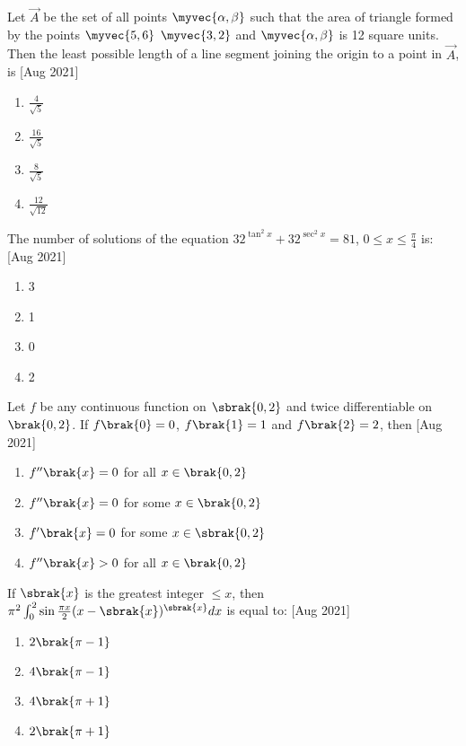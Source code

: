 
\iffalse
  \title{August:2021}
  \author{AI24BTECH11016}
  \section{mcq-single}
\fi
	\item
	Let $\vec{A}$ be the set of all points $\myvec{\alpha , \beta}$ such that the area of triangle formed by the points $\myvec{5 , 6}$ $\myvec{3 , 2}$ and $\myvec{\alpha , \beta}$ is 12 square units. Then the least possible length of a line segment joining the origin to a point in $\vec{A}$, is 
	\hfill [Aug 2021]
		\begin{enumerate}
			\item  $\frac{4}{\sqrt{5}}$
			\item  $\frac{16}{\sqrt{5}}$
			\item  $\frac{8}{\sqrt{5}}$
			\item  $\frac{12}{\sqrt{12}}$
		\end{enumerate}
	\item
	The number of solutions of the equation $32^{\tan^{2}{x}} + 32^{\sec^{2}{x}} = 81$, $0 \leq x \leq \frac{\pi}{4}$ is:
	\hfill [Aug 2021]
		\begin{enumerate}
			\item 3
			\item 1
			\item 0
			\item 2
		\end{enumerate}
	\item 
	Let $f$ be any continuous function on $\sbrak{0, 2}$ and twice differentiable on $\brak{0, 2}$. If $f\brak{0} = 0$, $f\brak{1} = 1$ and $f\brak{2} = 2$, then
	\hfill [Aug 2021]
		\begin{enumerate}
			\item  $f^{\prime\prime}\brak{x} = 0$ for all $x \in \brak{0, 2}$
			\item  $f^{\prime\prime}\brak{x} = 0$ for some $x \in \brak{0, 2}$
			\item  $f^{\prime}\brak{x} = 0$ for some $x \in \sbrak{0, 2}$
			\item  $f^{\prime\prime}\brak{x} > 0$ for all $x \in \brak{0, 2}$
		\end{enumerate}
	\item 
	If $\sbrak{x}$ is the greatest integer $\leq x$, then $\pi^{2}\int_{0}^{2} \sin{\frac{\pi x}{2}}(x-\sbrak{x})^{\sbrak{x}} dx$ is equal to:
	\hfill [Aug 2021]
		\begin{enumerate}
			\item $2\brak{\pi-1}$
			\item $4\brak{\pi-1}$
			\item $4\brak{\pi+1}$
			\item $2\brak{\pi+1}$
		\end{enumerate}
